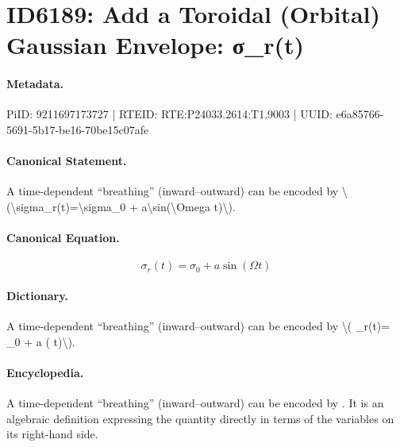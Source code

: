 \section*{ID6189: Add a Toroidal (Orbital) Gaussian Envelope: σ\_r(t)}
\paragraph{Metadata.}
PiID: 9211697173727 | RTEID: RTE:P24033.2614:T1.9003 | UUID: e6a85766-5691-5b17-be16-70be15c07afe

\paragraph{Canonical Statement.}
A time-dependent “breathing” (inward–outward) can be encoded by \textbackslash{}(\textbackslash{}sigma\_r(t)=\textbackslash{}sigma\_0 + a\textbackslash{}sin(\textbackslash{}Omega t)\textbackslash{}).

\paragraph{Canonical Equation.}
\[
\sigma_r(t)=\sigma_0 + a\sin(\Omega t)
\]

\paragraph{Dictionary.}
A time-dependent “breathing” (inward–outward) can be encoded by \textbackslash{}( \_r(t)= \_0 + a ( t)\textbackslash{}).

\paragraph{Encyclopedia.}
A time-dependent “breathing” (inward–outward) can be encoded by . It is an algebraic definition expressing the quantity directly in terms of the variables on its right-hand side.
